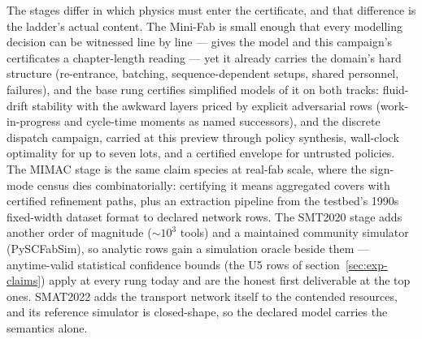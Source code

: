 The stages differ in which physics must enter the certificate, and
that difference is the ladder's actual content. The Mini-Fab is small
enough that every modelling decision can be witnessed line by line
--- 
gives the model and this campaign's certificates a chapter-length
reading --- yet it already carries the domain's hard structure
(re-entrance, batching, sequence-dependent setups, shared personnel,
failures), and the base rung certifies simplified models of it on
both tracks: fluid-drift
stability with the awkward layers priced by explicit adversarial
rows (work-in-progress and cycle-time moments as named successors),
and the discrete dispatch campaign, carried at this preview through
policy synthesis, wall-clock optimality for up to seven lots, and a
certified envelope
for untrusted policies. The
MIMAC stage is the same claim species at real-fab scale, where the
sign-mode census dies combinatorially: certifying it means aggregated
covers with certified refinement paths, plus an extraction pipeline
from the testbed's 1990s fixed-width dataset format to declared
network rows. The SMT2020 stage adds another order of magnitude
($\sim\!10^3$ tools) and a maintained community simulator
(PySCFabSim), so analytic rows gain a simulation oracle beside them
--- anytime-valid statistical confidence bounds (the U5 rows of
section~\ref{sec:exp-claims}) apply at every rung today and are the
honest first deliverable at the top ones. SMAT2022 adds the transport
network itself to the contended resources, and its reference
simulator is closed-shape, so the declared model carries the
semantics alone.

